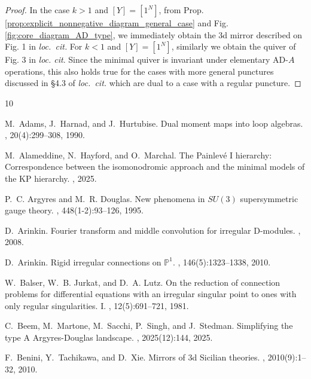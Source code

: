 \documentclass[11pt,a4paper]{amsart}
\numberwithin{equation}{section}
\begin{document}
\begin{proof}
In the case $k>1$ and $[Y]=[1^N]$, from Prop. \ref{prop:explicit_nonnegative_diagram_general_case} and Fig. \ref{fig:core_diagram_AD_type}, we immediately obtain the 3d mirror described on Fig. 1 in \emph{loc.~cit.}
For $k<1$ and $[Y]=[1^N]$, similarly we obtain the quiver of Fig. 3 in \emph{loc. cit}. Since the minimal quiver is invariant under elementary AD-$A$ operations, this also holds true for the cases with more general punctures discussed in §4.3 of \emph{loc.~cit.} which are dual to a case with a regular puncture.
\end{proof}

\begin{thebibliography}{10}

M.~Adams, J.~Harnad, and J.~Hurtubise.
\newblock Dual moment maps into loop algebras.
, 20(4):299--308, 1990.

M.~Alameddine, N.~Hayford, and O.~Marchal.
\newblock The {P}ainlev\'e {I} hierarchy: {C}orrespondence between the
  isomonodromic approach and the minimal models of the {KP} hierarchy.
, 2025.

P.~C. Argyres and M.~R. Douglas.
\newblock New phenomena in {$SU(3)$} supersymmetric gauge theory.
, 448(1-2):93--126, 1995.

D.~Arinkin.
\newblock Fourier transform and middle convolution for irregular {D}-modules.
, 2008.

D.~Arinkin.
\newblock Rigid irregular connections on {$\mathbb P^1$}.
, 146(5):1323--1338, 2010.

W.~Balser, W.~B. Jurkat, and D.~A. Lutz.
\newblock On the reduction of connection problems for differential equations
  with an irregular singular point to ones with only regular singularities.
  {I}.
, 12(5):691--721, 1981.

C.~Beem, M.~Martone, M.~Sacchi, P.~Singh, and J.~Stedman.
\newblock Simplifying the type {A} {A}rgyres-{D}ouglas landscape.
, 2025(12):144, 2025.

F.~Benini, Y.~Tachikawa, and D.~Xie.
\newblock Mirrors of {3}d {S}icilian theories.
, 2010(9):1--32, 2010.


\end{thebibliography}
\end{document}

